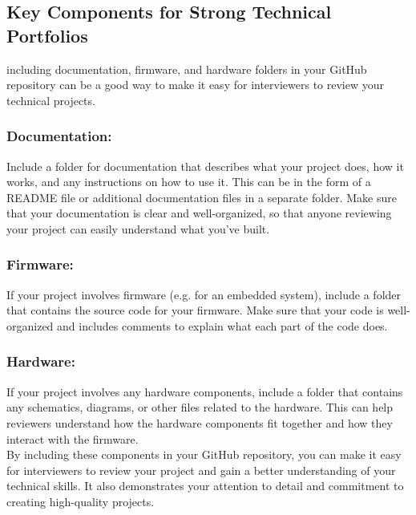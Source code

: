 \documentclass[12pt]{article}
\begin{document}
\subsection{Key Components for Strong Technical Portfolios}
including documentation, firmware, and hardware folders in your GitHub repository can be a good way to make it easy for interviewers to review your technical projects.

\subsubsection{Documentation:} Include a folder for documentation that describes what your project does, how it works, and any instructions on how to use it. This can be in the form of a README file or additional documentation files in a separate folder. Make sure that your documentation is clear and well-organized, so that anyone reviewing your project can easily understand what you've built.

\subsubsection{Firmware:} If your project involves firmware (e.g. for an embedded system), include a folder that contains the source code for your firmware. Make sure that your code is well-organized and includes comments to explain what each part of the code does.

\subsubsection{Hardware:} If your project involves any hardware components, include a folder that contains any schematics, diagrams, or other files related to the hardware. This can help reviewers understand how the hardware components fit together and how they interact with the firmware.\\

By including these components in your GitHub repository, you can make it easy for interviewers to review your project and gain a better understanding of your technical skills. It also demonstrates your attention to detail and commitment to creating high-quality projects.
\end{document}
